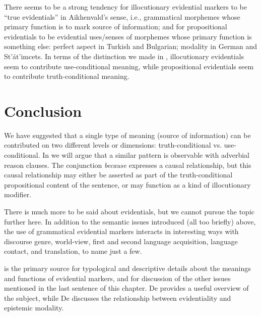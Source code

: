 There seems to be a strong tendency for illocutionary evidential markers to be “true evidentials” in Aikhenvald’s sense, i.e., grammatical morphemes whose primary function is to mark source of information; and for propositional evidentials to be evidential uses/senses of morphemes whose primary function is something else: perfect aspect in Turkish and Bulgarian; modality in German and St’át’imcets. In terms of the distinction we made in , illocutionary evidentials seem to contribute use-conditional meaning, while propositional evidentials seem to contribute truth-conditional meaning.


\section{Conclusion}\label{sec:17.6}

We have suggested that a single type of meaning (source of information) can be contributed on two different levels or dimensions: truth-conditional vs. use-conditional. In  we will argue that a similar pattern is observable with adverbial reason clauses. The conjunction \textit{because} expresses a causal relationship, but this causal relationship may either be asserted as part of the truth-conditional propositional content of the sentence, or may function as a kind of illocutionary modifier.



There is much more to be said about evidentials, but we cannot pursue the topic further here. In addition to the semantic issues introduced (all too briefly) above, the use of grammatical evidential markers interacts in interesting ways with discourse genre, world-view, first and second language acquisition, language contact, and translation, to name just a few.



\furtherreading



\citet{Aikhenvald2004} is the primary source for typological and descriptive details about the meanings and functions of evidential markers, and for discussion of the other issues mentioned in the last sentence of this chapter. De \citet{Haan2012} provides a useful overview of the subject, while De \citet{Haan1999,Haan2005} discusses the relationship between evidentiality and epistemic modality.